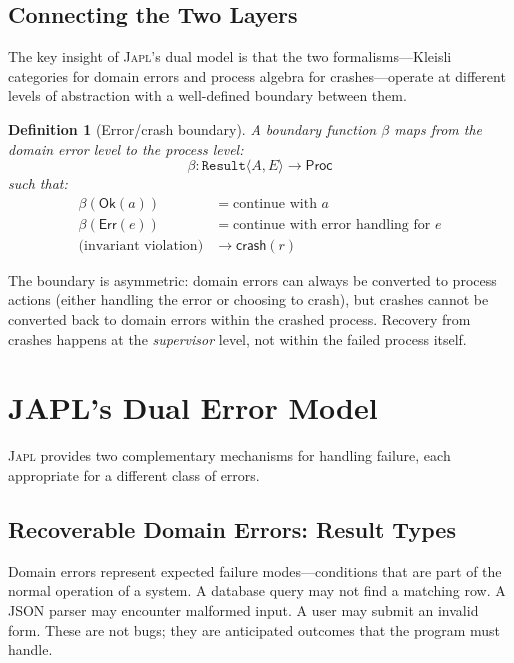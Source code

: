 \documentclass[11pt,twocolumn]{article}
\newtheorem{definition}[theorem]{Definition}
\newcommand{\japl}{\textsc{Japl}}
\newcommand{\Result}{\texttt{Result}}
\newcommand{\Proc}{\mathsf{Proc}}
\newcommand{\crash}{\mathsf{crash}}
\newcommand{\OK}{\ensuremath{\mathsf{Ok}}}
\newcommand{\Err}{\ensuremath{\mathsf{Err}}}
\begin{document}
\subsection{Connecting the Two Layers}

The key insight of \japl{}'s dual model is that the two formalisms---Kleisli categories for domain errors and process algebra for crashes---operate at different levels of abstraction with a well-defined boundary between them.

\begin{definition}[Error/crash boundary]
A \emph{boundary function} $\beta$ maps from the domain error level to the process level:
\[
  \beta : \Result\langle A, E\rangle \to \Proc
\]
such that:
\begin{align*}
  \beta(\OK(a)) &= \text{continue with } a \\
  \beta(\Err(e)) &= \text{continue with error handling for } e \\
  \text{(invariant violation)} &\to \crash(r)
\end{align*}
\end{definition}

The boundary is asymmetric: domain errors can always be converted to process actions (either handling the error or choosing to crash), but crashes cannot be converted back to domain errors within the crashed process. Recovery from crashes happens at the \emph{supervisor} level, not within the failed process itself.

\section{JAPL's Dual Error Model}\label{sec:dual}

\japl{} provides two complementary mechanisms for handling failure, each appropriate for a different class of errors.

\subsection{Recoverable Domain Errors: Result Types}

Domain errors represent expected failure modes---conditions that are part of the normal operation of a system. A database query may not find a matching row. A JSON parser may encounter malformed input. A user may submit an invalid form. These are not bugs; they are anticipated outcomes that the program must handle.
\end{document}
